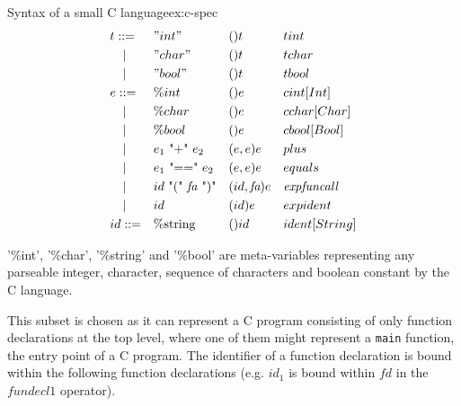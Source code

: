 \begin{example}{Syntax of a small C language}{ex:c-spec}
\[\begin{aligned}
       & t ::=           &  & "int"                                                  &  & ()t                           &  & tint                 \\
       & \quad |         &  & "char"                                                 &  & ()t                           &  & tchar                \\
       & \quad |         &  & "bool"                                                 &  & ()t                           &  & tbool                \\
       & e ::=           &  & \%int                                                  &  & ()e                           &  & cint[Int]            \\
       & \quad |         &  & \%char                                                 &  & ()e                           &  & cchar[Char]          \\
       & \quad |         &  & \%bool                                                 &  & ()e                           &  & cbool[Bool]          \\
       & \quad |         &  & \text{$e_1$ "+" $e_2$}                                 &  & (e,e)e                        &  & plus                 \\
       & \quad |         &  & \text{$e_1$ "==" $e_2$}                                &  & (e,e)e                        &  & equals               \\
       & \quad |         &  & \text{$id$ "(" \textit{fa} ")"}                        &  & (id,\textit{fa})e             &  & \textit{expfuncall}  \\
       & \quad |         &  & \text{$id$}                                            &  & (id)e                         &  & expident             \\
       & id ::=          &  & \%\text{string}                                        &  & ()id                          &  & ident[String]        \\
    \end{aligned}
  \]

  '\%int', '\%char', '\%string' and '\%bool' are meta-variables representing any parseable integer, character, sequence of characters and boolean constant by the C language.

  This subset is chosen as it can represent a C program consisting of only function declarations at the top level, where one of them might represent a \texttt{main} function, the entry point of a C program. The identifier of a function declaration is bound within the following function declarations (e.g. $id_1$ is bound within $\textit{fd}$ in the $\textit{fundecl1}$ operator).


\end{example}
